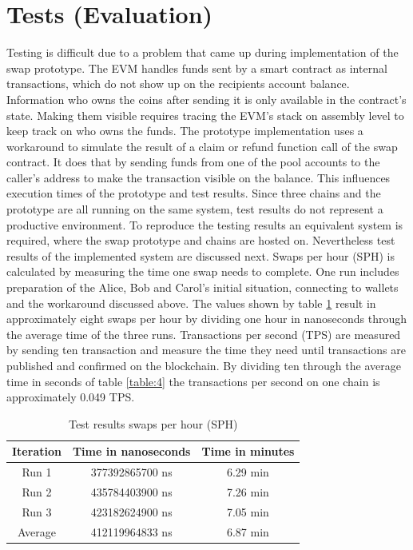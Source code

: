 \section{Tests (Evaluation)}
\label{sec:chapter04:poc}
Testing is difficult due to a problem that came up during implementation of the swap prototype. The \ac{EVM} handles funds sent by a smart contract as internal transactions, which do not show up on the recipients account balance. Information who owns the coins after sending it is only available in the contract's state. Making them visible requires tracing the \ac{EVM}'s stack on assembly level to keep track on who owns the funds. The prototype implementation uses a workaround to simulate the result of a claim or refund function call of the swap contract. It does that by sending funds from one of the pool accounts to the caller's address to make the transaction visible on the balance. This influences execution times of the prototype and test results. Since three chains and the prototype are all running on the same system, test results do not represent a productive environment. To reproduce the testing results an equivalent system is required, where the swap prototype and chains are hosted on. Nevertheless test results of the implemented system are discussed next. Swaps per hour (SPH) is calculated by measuring the time one swap needs to complete. One run includes preparation of the Alice, Bob and Carol's initial situation, connecting to wallets and the workaround discussed above. The values shown by table \ref{table:3} result in approximately eight swaps per hour by dividing one hour in nanoseconds through the average time of the three runs. Transactions per second (TPS) are measured by sending ten transaction and measure the time they need until transactions are published and confirmed on the blockchain. By dividing ten through the average time in seconds of table \ref{table:4} the transactions per second on one chain is approximately 0.049 TPS.

\begin{table}[h!]
	\centering
	\begin{tabular}{|c | c | c |} 
		\hline 
		Iteration & Time in nanoseconds & Time in minutes \\ [0.5ex] 
		\hline \hline
		Run 1 & 377392865700 ns & 6.29 min  \\ 
		\hline
		Run 2 & 435784403900 ns & 7.26 min  \\
		\hline
		Run 3 & 423182624900 ns & 7.05 min  \\
		\hline
		Average & 412119964833 ns & 6.87 min  \\ [1ex] 
		\hline
	\end{tabular}
	\caption{Test results swaps per hour (SPH)}
	\label{table:3}
\end{table}

